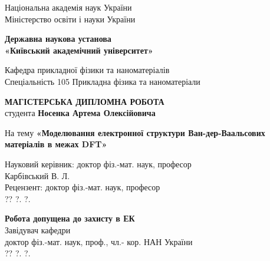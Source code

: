 \begin{titlepage}
 \begin{center}
Національна академія наук України \\
Міністерство освіти і науки України
  \vspace{0.25cm}
  
  \textbf{Державна наукова установа \\ 
  «Київський академічний університет»}
  \vspace{0.5cm}
  
  Кафедра прикладної фізики та наноматеріалів
  \\ Спеціальність 105 Прикладна фізика та наноматеріали
  
  \vspace{1cm}
  
  \large\textbf{МАГІСТЕРСЬКА  ДИПЛОМНА  РОБОТА} \\
  студента  \textbf{Носенка Артема Олексійовича}
 \end{center}
\begin{center}
 {На тему \large\textbf{«Моделювання електронної структури Ван-дер-Ваальсових матеріалів в межах DFT»}\par}
\end{center}
\vspace{0.5cm}

\hfill\parbox{12cm}{
\begin{flushleft}
 \hfill Науковий керівник: доктор фіз.-мат. наук, професор \\
 \hfill \underline{\hspace{4cm}} \hspace{1cm} Карбівський В. Л. \\
 \hfill Рецензент: доктор фіз.-мат. наук, професор \\
 \hfill \underline{\hspace{4cm}} \hspace{1cm} ?? ?. ?. \\
\end{flushleft}}

\hfill\parbox{10cm}{
\begin{flushleft}
 \begin{center}
 \small
     \textbf{Робота допущена до захисту в ЕК} \\
     Завідувач кафедри \\
     доктор фіз.-мат. наук, проф., чл.- кор. НАН України \\
     \hfill \underline{\hspace{4cm}} \hspace{1cm} ?? ?. ?. 
 \end{center}
\end{flushleft}}


\end{titlepage}
